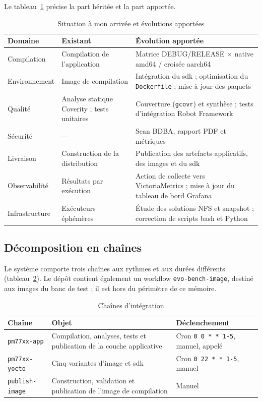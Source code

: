 Le tableau~\ref{tab:bes-herite-evolue} précise la part héritée et la part
apportée.

\begin{table}[H]
\centering
\caption{Situation à mon arrivée et évolutions apportées}
\label{tab:bes-herite-evolue}
\small
\begin{tabularx}{\textwidth}{@{}p{3.3cm} X X@{}}
\toprule
\textbf{Domaine} & \textbf{Existant} & \textbf{Évolution apportée} \\
\midrule
Compilation & Compilation de l'application &
  Matrice DEBUG/RELEASE $\times$ native amd64 / croisée aarch64 \\
Environnement & Image de compilation &
  Intégration du \gls{sdk} ; optimisation du \texttt{Dockerfile} ; mise à jour des paquets \\
Qualité & Analyse statique Coverity ; tests unitaires &
  Couverture (\texttt{gcovr}) et synthèse ; tests d'intégration Robot Framework \\
Sécurité & --- & Scan BDBA, rapport PDF et métriques \\
Livraison & Construction de la distribution &
  Publication des artefacts applicatifs, des images et du \gls{sdk} \\
Observabilité & Résultats par exécution &
  Action de collecte vers VictoriaMetrics ; mise à jour du tableau de bord Grafana \\
Infrastructure & Exécuteurs éphémères &
  Étude des solutions NFS et snapshot ; correction de scripts bash et Python \\
\bottomrule
\end{tabularx}
\end{table}

\subsection{Décomposition en chaînes}
\label{ssec:bes-chaines}

Le système comporte trois chaînes aux rythmes et aux durées différents
(tableau~\ref{tab:bes-chaines}). Le dépôt contient également un workflow
\texttt{evo-bench-image}, destiné aux images du banc de test ; il est hors du
périmètre de ce mémoire.

\begin{table}[H]
\centering
\caption{Chaînes d'intégration}
\label{tab:bes-chaines}
\small
\begin{tabularx}{\textwidth}{@{}l X p{4cm}@{}}
\toprule
\textbf{Chaîne} & \textbf{Objet} & \textbf{Déclenchement} \\
\midrule
\texttt{pm77xx-app} & Compilation, analyses, tests et publication de la couche applicative &
  Cron \texttt{0 0 * * 1-5}, manuel, appelé \\
\texttt{pm77xx-yocto} & Cinq variantes d'image et \gls{sdk} &
  Cron \texttt{0 22 * * 1-5}, manuel \\
\texttt{publish-image} & Construction, validation et publication de l'image de compilation &
  Manuel \\
\bottomrule
\end{tabularx}
\end{table}

